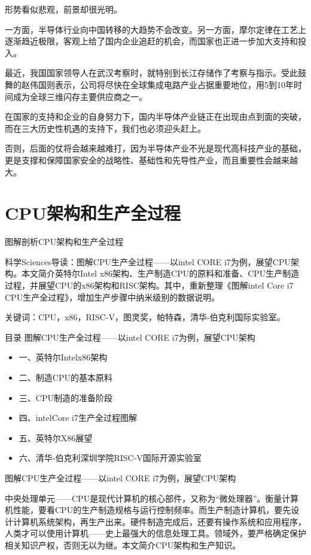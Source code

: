 \documentclass[utf8]{book}
\begin{document}
	形势看似悲观，前景却很光明。
	
	一方面，半导体行业向中国转移的大趋势不会改变。另一方面，摩尔定律在工艺上逐渐趋近极限，客观上给了国内企业追赶的机会，而国家也正进一步加大支持和投入。
	
	最近，我国国家领导人在武汉考察时，就特别到长江存储作了考察与指示。受此鼓舞的赵伟国则表示，公司将尽快在全球集成电路产业占据重要地位，用5到10年时间成为全球三维闪存主要供应商之一。
	
	在国家的支持和企业的自身努力下，国内半导体产业链正在出现由点到面的突破，而在三大历史性机遇的支持下，我们也必须迎头赶上。
	
	否则，后面的仗将会越来越难打，因为半导体产业不光是现代高科技产业的基础，更是支撑和保障国家安全的战略性、基础性和先导性产业，而且重要性会越来越大。
	\section{CPU架构和生产全过程}
	
	图解剖析CPU架构和生产全过程
	
	科学Sciences导读：图解CPU生产全过程——以intel CORE i7为例，展望CPU架构。本文简介英特尔Intel x86架构、生产制造CPU的原料和准备、CPU生产制造过程，并展望CPU的x86架构和RISC架构。其中，重新整理《图解intel Core i7 CPU生产全过程》，增加生产步骤中纳米级别的数据说明。
	
	关键词：CPU，x86，RISC-V，图灵奖，帕特森，清华-伯克利国际实验室。
	
	目录
	图解CPU生产全过程——以intel CORE i7为例，展望CPU架构 \\
	\begin{itemize}
		\item 一、英特尔Intelx86架构
		\item 二、制造CPU的基本原料
		\item 三、CPU制造的准备阶段
		\item 四、intelCore i7生产全过程图解
		\item 五、英特尔X86展望
		\item 六、清华-伯克利深圳学院RISC-V国际开源实验室
		
	\end{itemize}
	
	图解CPU生产全过程——以intel CORE i7为例，展望CPU架构
	
	中央处理单元——CPU是现代计算机的核心部件，又称为“微处理器”。衡量计算机性能，要看CPU的生产制造规格与运行控制频率。而生产制造计算机，要先设计计算机系统架构，再生产出来。硬件制造完成后，还要有操作系统和应用程序，人类才可以使用计算机——史上最强大的信息处理工具。领域外，要严格确定保护相关知识产权，否则无以为继。本文简介CPU架构和生产知识。
	
\end{document}
